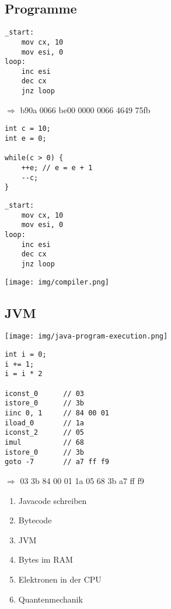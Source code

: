 \documentclass{beamer}
\begin{document}
\subsection{Programme}
\begin{frame}[fragile]{\subsecname}
  \begin{lstlisting}
_start:
	mov cx, 10
	mov esi, 0
loop:
	inc esi
	dec cx
	jnz loop
  \end{lstlisting}

  $\Rightarrow$ b90a 0066 be00 0000 0066 4649 75fb
\end{frame}

\begin{frame}[fragile]{\subsecname}
  \begin{lstlisting}
int c = 10;
int e = 0;

while(c > 0) {
    ++e; // e = e + 1
    --c;
}
  \end{lstlisting}
  
  \begin{lstlisting}
_start:
	mov cx, 10
	mov esi, 0
loop:
	inc esi
	dec cx
	jnz loop
  \end{lstlisting}
\end{frame}

\begin{frame}{\subsecname}
  \centering
  \texttt{[image: img/compiler.png]}  
\end{frame}

\subsection{JVM}
\begin{frame}{\subsecname}
  \centering
  \texttt{[image: img/java-program-execution.png]}  
\end{frame}

\begin{frame}[fragile]{\subsecname}
  \begin{lstlisting}
int i = 0;
i += 1;
i = i * 2
    
iconst_0      // 03
istore_0      // 3b
iinc 0, 1     // 84 00 01
iload_0       // 1a
iconst_2      // 05
imul          // 68
istore_0      // 3b
goto -7       // a7 ff f9
  \end{lstlisting}
  $\Rightarrow$ 03 3b 84 00 01 1a 05 68 3b a7 ff f9
\end{frame}

\begin{frame}{\subsecname}
  \begin{enumerate}
  \item Javacode schreiben
  \item Bytecode
  \item JVM
  \item Bytes im RAM
  \item Elektronen in der CPU
  \item Quantenmechanik
  \end{enumerate}
\end{frame}
\end{document}
